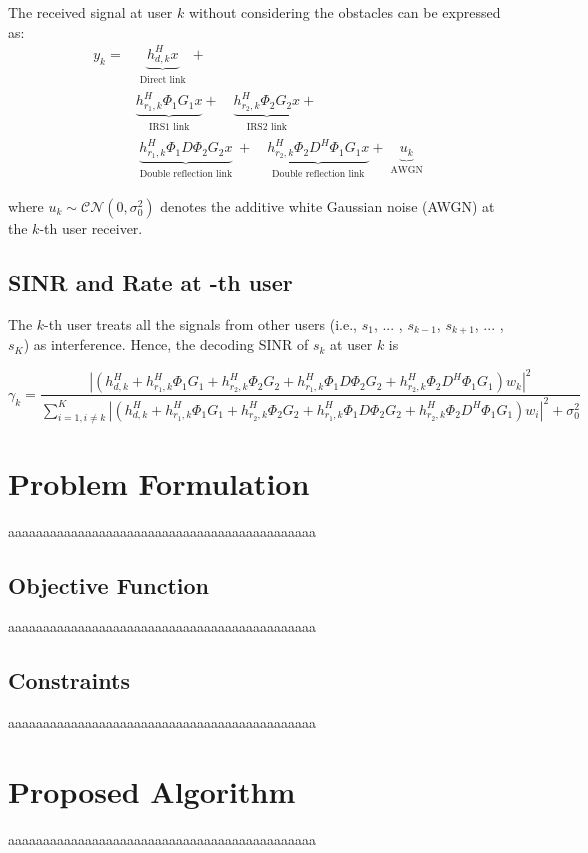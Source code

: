 \documentclass[11pt,twocolumn,twoside]{opticajnl}
\begin{document}
The received signal at user $k$ without considering the obstacles can be expressed as:
\begin{align*}
	y_k = &\underbrace{h_{d,k}^H x}_
	{\substack{\text{Direct link}}}
	+ \quad \\
	&\underbrace{h_{r_1,k}^H \Phi_1 G_1 x}_
	{\substack{\text{IRS1 link}}}
	+ \quad
	\underbrace{h_{r_2,k}^H \Phi_2 G_2 x}_
	{\substack{\text{IRS2 link}}}
	+ \quad \\ 
	&\underbrace{h_{r_1,k}^H \Phi_1 D \Phi_2 G_2 x}_
	{\substack{\text{Double reflection link}}}
	+ \quad
	\underbrace{h_{r_2,k}^H \Phi_2 D^H \Phi_1 G_1 x}_
	{\substack{\text{Double reflection link}}} +
	\underbrace{u_k}_
	{\substack{\text{AWGN}}}
\end{align*}

where $u_k \sim \mathcal{CN}(0, \sigma_0^2)$ denotes the additive white Gaussian noise (AWGN) at the $k$-th user receiver.

\subsection{SINR and Rate at -th user}
The $k$-th user treats all the signals from other users (i.e.,
$s_1$, ... , $s_{k-1}$, $s_{k+1}$, ... , $s_K$) as interference. Hence, the decoding SINR of $s_k$ at user $k$ is

\[
\gamma_k = \frac{{\left|\left(h_{d,k}^H + h_{r_1,k}^H \Phi_1 G_1 + h_{r_2,k}^H \Phi_2 G_2 + h_{r_1,k}^H \Phi_1 D \Phi_2 G_2 + h_{r_2,k}^H \Phi_2 D^H \Phi_1 G_1 \right)w_k\right|^2}}{{\sum_{i=1,i\neq k}^{K} \left|\left(h_{d,k}^H + h_{r_1,k}^H \Phi_1 G_1 + h_{r_2,k}^H \Phi_2 G_2 + h_{r_1,k}^H \Phi_1 D \Phi_2 G_2 + h_{r_2,k}^H \Phi_2 D^H \Phi_1 G_1 \right)w_i\right|^2 + \sigma^2_0}}
\]

\section{Problem Formulation}
aaaaaaaaaaaaaaaaaaaaaaaaaaaaaaaaaaaaaaaaaaaa
\subsection{Objective Function}
aaaaaaaaaaaaaaaaaaaaaaaaaaaaaaaaaaaaaaaaaaaa
\subsection{Constraints}
aaaaaaaaaaaaaaaaaaaaaaaaaaaaaaaaaaaaaaaaaaaa
\section{Proposed Algorithm}
aaaaaaaaaaaaaaaaaaaaaaaaaaaaaaaaaaaaaaaaaaaa
\end{document}
